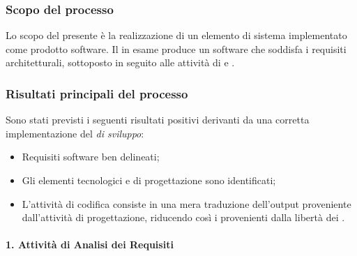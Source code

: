        \subsubsection{Scopo del processo}
        Lo scopo del presente  \`e la realizzazione di un elemento di sistema implementato come prodotto
        software. Il  in esame produce un software che soddisfa i requisiti architetturali, sottoposto
        in seguito alle attivit\`a di  e .
        
        \subsubsection{Risultati principali del processo}
        Sono stati previsti i seguenti risultati positivi derivanti da una corretta implementazione del \textit{ di sviluppo}:

        \begin{itemize}
          \item Requisiti software ben delineati;
          \item Gli elementi tecnologici e di progettazione sono identificati;
          \item L'attivit\`a di codifica consiste in una mera traduzione dell'output proveniente dall'attivit\`a di progettazione,
            riducendo cos\`i i  provenienti dalla libert\`a dei .
        \end{itemize}
        
		\paragraph*{1. Attività di Analisi dei Requisiti}
